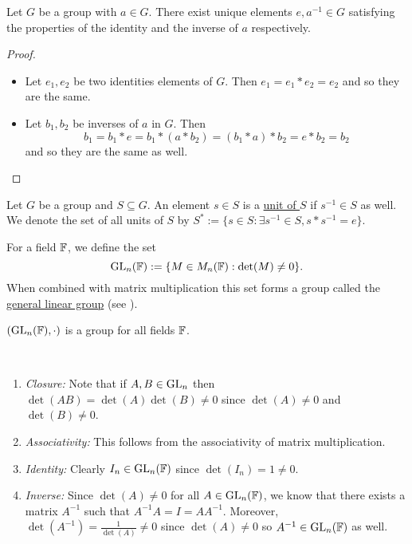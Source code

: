 \documentclass[11pt]{article}
\begin{document}
\begin{proposition}
    Let $G$ be a group with $a\in G$. There exist unique elements $e,a^{-1}\in G$ satisfying the properties of the identity and the inverse of $a$ respectively.
\end{proposition}

\begin{proof}\,
    \begin{itemize}
        \item Let $e_1,e_2$ be two identities elements of $G$. Then $e_1=e_1*e_2=e_2$ and so they are the same.
        \item Let $b_1,b_2$ be inverses of $a$ in $G$. Then
        \[b_1=b_1*e=b_1*(a*b_2)=(b_1*a)*b_2=e*b_2=b_2\]
        and so they are the same as well.
    \end{itemize}
\end{proof}

\begin{definition}[Units]
    Let $G$ be a group and $S\subseteq G$. An element $s\in S$ is a \ul{unit of $S$} if $s^{-1}\in S$ as well. We denote the set of all units of $S$ by $S^*:=\{s\in S:\exists s^{-1}\in S,s*s^{-1}=e\}$.
\end{definition}

\begin{definition}
    For a field $\mathbb{F}$, we define the set $$\operatorname{GL}_n(\mathbb{F}):=\{M\in M_n(\mathbb{F}):\det(M)\neq0\}.$$ When combined with matrix multiplication this set forms a group called the \ul{general linear group} (see ).
\end{definition}

\begin{proposition}
    $(\operatorname{GL}_n(\mathbb{F}),\cdot)$ is a group for all fields $\mathbb{F}$.
\end{proposition}

\proof\,
\begin{enumerate}
    \item\emph{Closure:} Note that if $A,B\in\operatorname{GL}_n$ then $\det(AB)=\det(A)\det(B)\neq0$ since $\det(A)\neq0$ and $\det(B)\neq0$.
    \item\emph{Associativity:} This follows from the associativity of matrix multiplication.
    \item\emph{Identity:} Clearly $I_n\in\operatorname{GL}_n(\mathbb{F})$ since $\det(I_n)=1\neq0$.
    \item\emph{Inverse:} Since $\det(A)\neq0$ for all $A\in\operatorname{GL}_n(\mathbb{F})$, we know that there exists a matrix $A^{-1}$ such that $A^{-1}A=I=AA^{-1}$. Moreover, $\det(A^{-1})=\frac{1}{\det(A)}\neq0$ since $\det(A)\neq0$ so $A^{-1}\in\operatorname{GL}_n(\mathbb{F})$ as well.
\end{enumerate}
\end{document}
